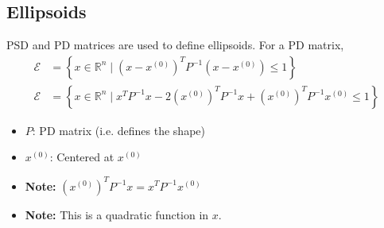 \subsection{Ellipsoids}
\begin{definition}
    PSD and PD matrices are used to define ellipsoids. For a PD matrix,
    \begin{align*}
        \mathcal{E} &= \left\{ x \in \mathbb{R}^n \mid (x - x^{(0)})^T P^{-1} (x - x^{(0)}) \leq 1 \right\} \\
        \mathcal{E} &= \left\{ x \in \mathbb{R}^n \mid x^T P^{-1} x - 2(x^{(0)})^T P^{-1} x + (x^{(0)})^T P^{-1} x^{(0)}  \leq 1 \right\}
    \end{align*}       
    \begin{itemize}
        \item $P$: PD matrix (i.e. defines the shape)
        \item $x^{(0)}$: Centered at $x^{(0)}$
        \item \textbf{Note:} $(x^{(0)})^T P^{-1} x = x^T P^{-1} x^{(0)}$
        \item \textbf{Note:} This is a quadratic function in $x$.
    \end{itemize}
\end{definition}

